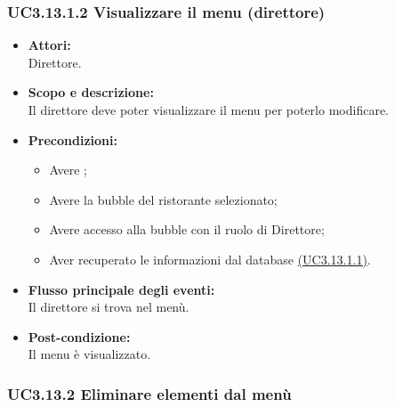 \subsubsection{UC3.13.1.2 Visualizzare il menu (direttore)} \label{UC3.13.1.2}

\begin{itemize}
	\item \textbf{Attori:}
	\\Direttore.
	\item \textbf{Scopo e descrizione:} 
	\\Il direttore deve poter visualizzare il menu per poterlo modificare.
	\item \textbf{Precondizioni:}
	\begin{itemize}
		\item Avere ;
		\item Avere la bubble del ristorante selezionato;
		\item Avere accesso alla bubble con il ruolo di Direttore;
		\item Aver recuperato le informazioni dal database \hyperref[UC3.13.1.1]{(UC3.13.1.1)}.
	\end{itemize}
	\item \textbf{Flusso principale degli eventi:}
	\\Il direttore si trova nel menù.
	\item \textbf{Post-condizione:}
	\\Il menu è visualizzato.
\end{itemize}

\subsubsection{UC3.13.2 Eliminare elementi dal menù} \label{UC3.13.2}

